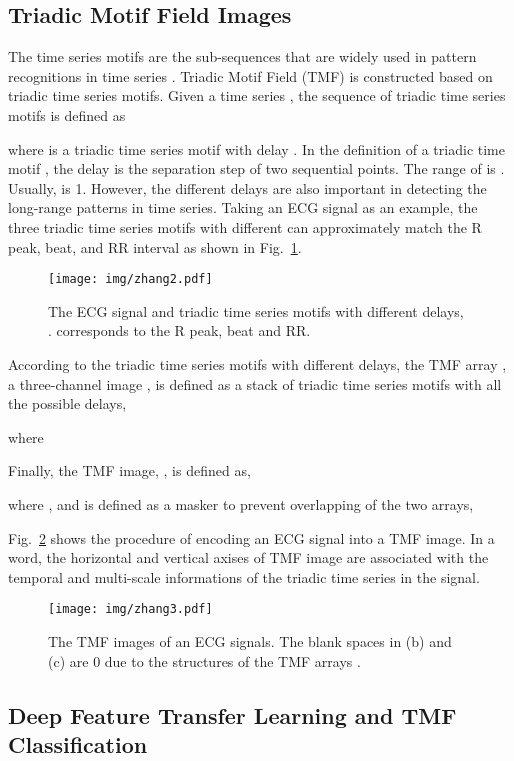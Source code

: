 \documentclass[journal]{IEEEtran}
\begin{document}
\subsection{Triadic Motif Field Images}
The time series motifs are the sub-sequences that are widely used in pattern recognitions in time series \cite{motif_2003,motif_2005,motif_2006}. 
Triadic Motif Field (TMF) is constructed based on triadic time series motifs.
Given a time series , the sequence of triadic time series motifs is defined as 

where  is a triadic time series motif  with delay .
In the definition of a triadic time motif , the delay  is the separation step of two sequential points. The range of  is . Usually,  is 1. However, the different delays are also important in detecting the long-range patterns in time series. Taking an ECG signal as an example, the three triadic time series motifs with different  can approximately match the R peak, beat, and RR interval as shown in Fig.~\ref{fig:triad}. 

\begin{figure}[H]
\centering
\texttt{[image: img/zhang2.pdf]}
\caption{The ECG signal and triadic time series motifs with different delays, .  corresponds to the R peak,  beat and  RR.}
\label{fig:triad}
\end{figure}

According to the triadic time series motifs with different delays, the TMF array , a three-channel image , is defined as a stack of triadic time series motifs with all the possible delays, 

where


Finally, the TMF image, , is defined as, 

where ,  and  is defined as a masker to prevent overlapping of the two arrays,


Fig.~\ref{fig:TMF} shows the procedure of encoding an ECG signal into a TMF image. In a word, the horizontal and vertical axises of TMF image are associated with the temporal and multi-scale informations of the triadic time series in the signal. 

\begin{figure}[H]
\centering
\texttt{[image: img/zhang3.pdf]}
\caption{The TMF images of an ECG signals. The blank spaces in (b) and (c) are 0 due to the structures of the TMF arrays . }
\label{fig:TMF}
\end{figure}

\subsection{Deep Feature Transfer Learning and TMF Classification}\label{sec:classify}
\end{document}
